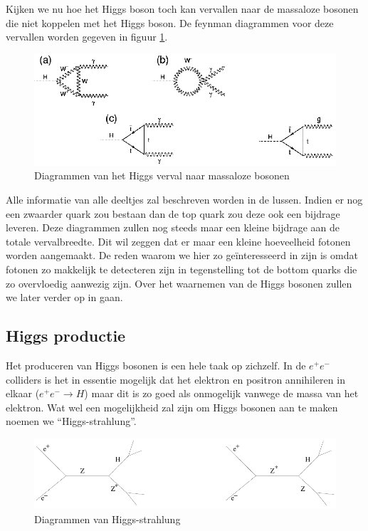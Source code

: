 \documentclass[../main.tex]{subfiles}
\begin{document}
Kijken we nu hoe het Higgs boson toch kan vervallen naar de massaloze bosonen die niet koppelen met het Higgs boson. De feynman diagrammen voor deze vervallen worden gegeven in figuur \ref{fig:higgs_boson/h_naar_foton_gluon}.

\begin{figure}[h]
    \centering
    \includegraphics[width=0.8\linewidth]{higgs_boson/h_naar_foton_gluon.png}
    \caption{Diagrammen van het Higgs verval naar massaloze bosonen}%
    \label{fig:higgs_boson/h_naar_foton_gluon}
\end{figure}

Alle informatie van alle deeltjes zal beschreven worden in de lussen. Indien er nog een zwaarder quark zou bestaan dan de top quark zou deze ook een bijdrage leveren. Deze diagrammen zullen nog steeds maar een kleine bijdrage aan de totale vervalbreedte. Dit wil zeggen dat er maar een kleine hoeveelheid fotonen worden aangemaakt. De reden waarom we hier zo geïnteresseerd in zijn is omdat fotonen zo makkelijk te detecteren zijn in tegenstelling tot de bottom quarks die zo overvloedig aanwezig zijn. Over het waarnemen van de Higgs bosonen zullen we later verder op in gaan.

\subsection{Higgs productie}%
\label{sub:higgs_productie}

Het produceren van Higgs bosonen is een hele taak op zichzelf. In de $e^+e^-$ colliders is het in essentie mogelijk dat het elektron en positron annihileren in elkaar ($e^+e^-\rightarrow H$) maar dit is zo goed als onmogelijk vanwege de massa van het elektron. Wat wel een mogelijkheid zal zijn om Higgs bosonen aan te maken noemen we ``Higgs-strahlung''.

\begin{figure}[h]
    \centering
    \includegraphics[width=0.6\linewidth]{higgs_boson/Higgs_strahlung.png}
    \caption{Diagrammen van Higgs-strahlung}%
    \label{fig:higgs_boson/Higgs_strahlung}
\end{figure}
\end{document}
